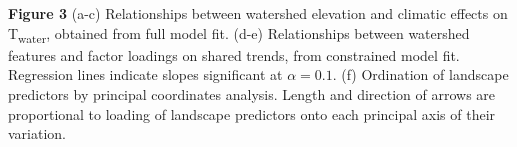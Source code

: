 \documentclass[notitlepage]{article}
\begin{document}
\begin{center}
\end{center}
\textbf{Figure 3} (a-c) Relationships between watershed elevation and climatic effects on T\textsubscript{water}, obtained from full model fit. (d-e) Relationships between watershed features and factor loadings on shared trends, from constrained model fit. Regression lines indicate slopes significant at $\alpha=0.1$. (f) Ordination of landscape predictors by principal coordinates analysis. Length and direction of arrows are proportional to loading of landscape predictors onto each principal axis of their variation.
\\[\baselineskip]
\end{document}
